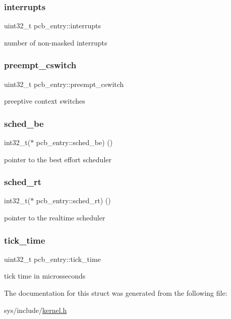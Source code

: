 \subsubsection{\texorpdfstring{interrupts}{interrupts}}
{\footnotesize\ttfamily uint32\+\_\+t pcb\+\_\+entry\+::interrupts}

number of non-\/masked interrupts \mbox{\label{structpcb__entry_af49c7195c79f5de2d70825e2252c8d77}} 
\subsubsection{\texorpdfstring{preempt\+\_\+cswitch}{preempt\_cswitch}}
{\footnotesize\ttfamily uint32\+\_\+t pcb\+\_\+entry\+::preempt\+\_\+cswitch}

preeptive context switches \mbox{\label{structpcb__entry_ab1848ecd2c321b6a19e80f0148beb053}} 
\subsubsection{\texorpdfstring{sched\+\_\+be}{sched\_be}}
{\footnotesize\ttfamily int32\+\_\+t($\ast$ pcb\+\_\+entry\+::sched\+\_\+be) ()}

pointer to the best effort scheduler \mbox{\label{structpcb__entry_afed67ff0db4482a197f9f98085c29724}} 
\subsubsection{\texorpdfstring{sched\+\_\+rt}{sched\_rt}}
{\footnotesize\ttfamily int32\+\_\+t($\ast$ pcb\+\_\+entry\+::sched\+\_\+rt) ()}

pointer to the realtime scheduler \mbox{\label{structpcb__entry_a998d1bf7b5ac3d6b0b9c4c6c7a0ebec6}} 
\subsubsection{\texorpdfstring{tick\+\_\+time}{tick\_time}}
{\footnotesize\ttfamily uint32\+\_\+t pcb\+\_\+entry\+::tick\+\_\+time}

tick time in microsseconds 

The documentation for this struct was generated from the following file\+:\begin{DoxyCompactItemize}
\item 
sys/include/\hyperlink{kernel_8h}{kernel.\+h}\end{DoxyCompactItemize}
